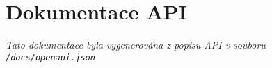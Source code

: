 \chapter{Dokumentace API}
\label{app:api}

\textit{
  Tato dokumentace byla vygenerována z popisu API v souboru \lstinline|/docs/openapi.json|
}

